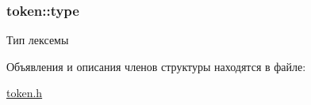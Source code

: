 \subsubsection[{\texorpdfstring{type}{type}}]{ token\+::type}\hypertarget{structtoken_ae4872e33fcec00c59c994c4c9ee3a1f5}{}\label{structtoken_ae4872e33fcec00c59c994c4c9ee3a1f5}


Тип лексемы 



Объявления и описания членов структуры находятся в файле\+:\begin{DoxyCompactItemize}
\item 
\hyperlink{token_8h}{token.\+h}\end{DoxyCompactItemize}
